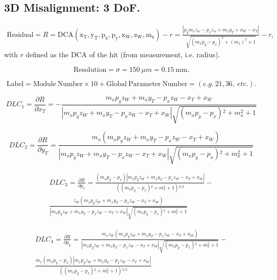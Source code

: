 \documentclass[a4paper,11pt]{article}
\begin{document}
\subsection{3D Misalignment: 3 DoF.}

\begin{equation}
\begin{split}
\mathrm{Residual} = R = \mathrm{DCA(x_T, y_T, p_x, p_y, x_W, z_W, m_x)} -r = \frac{| p_ym_xz_w-p_xz_w + m_xy_T + x_W - x_T |}{\sqrt{(m_x p_y-p_x)^2+(m_x)^2+1}} -r,
\end{split}
\end{equation}
with $r$ defined as the DCA of the hit (from measurement, i.e.  radius). 

\begin{equation}	
\mathrm{Resolution} = \sigma = 150 \ \mu m = 0.15 \ \mathrm{mm}.
\end{equation}

\begin{equation}	
\mathrm{Label}= \mathrm{Module \ Number} \times 10 + \mathrm{Global \ Parameter \ Number} = (e.g. \ 21, 36, \ etc.).
\end{equation}

\begin{equation}
DLC_1 = \frac{\partial R}{\partial x_T} =   -\frac{m_x p_y z_W+m_x y_T-p_x z_W-x_T+x_W}{|m_x p_y z_W+m_x y_T-p_x z_W-x_T+x_W|\sqrt{\left(m_x p_y-p_x\right){}^2+m_x^2+1}}
\end{equation}

\begin{equation}
DLC_2 = \frac{ \partial R}{\partial y_T} =  \frac{m_x (m_x p_y z_W+m_x y_T-p_x z_W-x_T+x_W)}{|m_x p_y z_W+m_x y_T-p_x z_W-x_T+x_W|\sqrt{\left(m_x p_y-p_x\right){}^2+m_x^2+1}} 
\end{equation}

\begin{equation}
\begin{split}
DLC_3 = \frac{ \partial R}{\partial p_x} = \frac{\left(m_x p_y-p_x\right) |m_x p_y z_W+m_x y_T-p_x z_W-x_T+x_W|}{\left(\left(m_x p_y-p_x\right){}^2+m_x^2+1\right){}^{3/2}}-\\
\frac{z_W(m_x p_y z_W+m_x y_T-p_x z_W-x_T+x_W)}{|m_x p_y z_W+m_x y_T-p_x z_W-x_T+x_W|\sqrt{\left(m_x p_y-p_x\right){}^2+m_x^2+1}}
\end{split}
\end{equation}

\begin{equation}
\begin{split}
DLC_4 = \frac{ \partial R}{\partial p_y} = \frac{m_x z_W(m_x p_y z_W+m_x y_T-p_x z_W-x_T+x_W)}{|m_x p_y z_W+m_x y_T-p_x z_W-x_T+x_W|\sqrt{\left(m_x p_y-p_x\right){}^2+m_x^2+1}}-\\
\frac{m_x \left(m_x p_y-p_x\right) |m_x p_y z_W+m_x y_T-p_x z_W-x_T+x_W|}{\left(\left(m_x p_y-p_x\right){}^2+m_x^2+1\right){}^{3/2}}
\end{split}
\end{equation}
\end{document}

